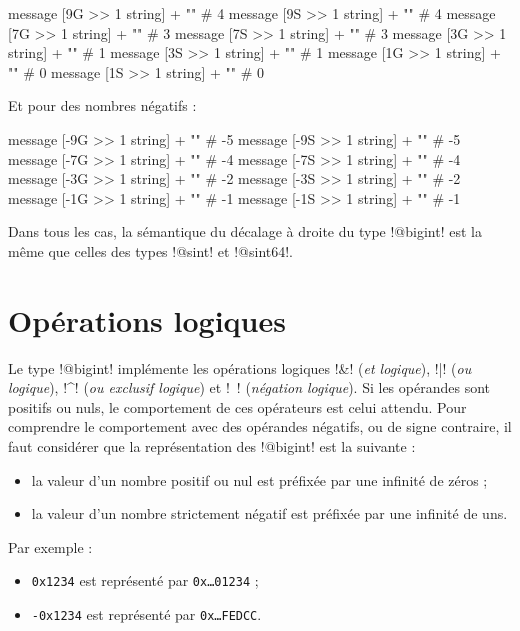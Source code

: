 \begin{galgas}
message [9G >> 1 string] + "\n" # 4
message [9S >> 1 string] + "\n" # 4
message [7G >> 1 string] + "\n" # 3
message [7S >> 1 string] + "\n" # 3
message [3G >> 1 string] + "\n" # 1
message [3S >> 1 string] + "\n" # 1
message [1G >> 1 string] + "\n" # 0
message [1S >> 1 string] + "\n" # 0
\end{galgas}


Et pour des nombres négatifs :

\begin{galgas}
message [-9G >> 1 string] + "\n" # -5
message [-9S >> 1 string] + "\n" # -5
message [-7G >> 1 string] + "\n" # -4
message [-7S >> 1 string] + "\n" # -4
message [-3G >> 1 string] + "\n" # -2
message [-3S >> 1 string] + "\n" # -2
message [-1G >> 1 string] + "\n" # -1
message [-1S >> 1 string] + "\n" # -1
\end{galgas}

Dans tous les cas, la sémantique du décalage à droite du type \ggs!@bigint! est la même que celles des types \ggs!@sint! et \ggs!@sint64!.










\section{Opérations logiques}

Le type \ggs!@bigint! implémente les opérations logiques \ggs!&! (\emph{et logique}), \ggs!|! (\emph{ou logique}), \ggs!^! (\emph{ou exclusif logique}) et \ggs!~! (\emph{négation logique}). Si les opérandes sont positifs ou nuls, le comportement de ces opérateurs est celui attendu. Pour comprendre le comportement avec des opérandes négatifs, ou de signe contraire, il faut considérer que la représentation des \ggs!@bigint! est la suivante :
\begin{itemize}
  \item la valeur d'un nombre positif ou nul est préfixée par une infinité de zéros ;
  \item la valeur d'un nombre strictement négatif est préfixée par une infinité de uns.
\end{itemize}

Par exemple :
\begin{itemize}
  \item \texttt{0x1234} est représenté par \texttt{0x…01234} ;
  \item \texttt{-0x1234} est représenté par \texttt{0x…FEDCC}.
\end{itemize}


